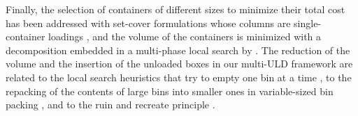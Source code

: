 Finally, the selection of containers of different sizes to minimize their total cost has been
addressed with set-cover formulations whose columns are single-container loadings
\citep{Che2011}, and the volume of the containers is minimized with a decomposition embedded in
a multi-phase local search by \citet{Toffolo2017}. The reduction of the volume and the insertion of the unloaded boxes in our multi-ULD
framework are related to the local search heuristics that try to empty one bin at a time
\citep{Faroe2003}, to the repacking of the contents of large bins into smaller ones in
variable-sized bin packing \citep{Ortmann2010}, and to the ruin and recreate principle
\citep{Schrimpf2000}.
